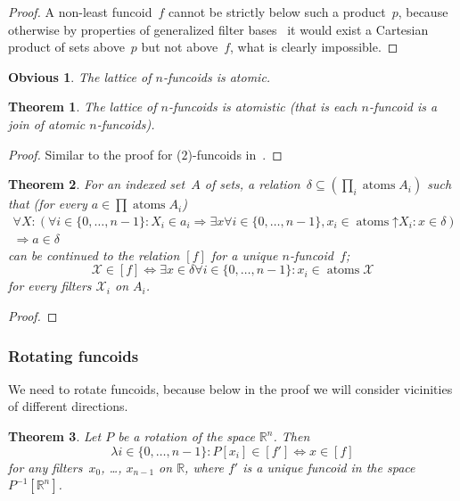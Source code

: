 \documentclass[oneside,draft]{amsart}
\newcommand{\atoms}{\operatorname{atoms}}
\newcommand{\suprel}[1]{\left[#1\right]}
\newtheorem{thm}{Theorem}
\newtheorem{obvious}{Obvious}
\begin{document}
\begin{proof}
A non-least funcoid~$f$ cannot be strictly below such a product~$p$, because otherwise by properties of generalized filter bases~\cite{volume-1} it would exist a Cartesian product of sets above~$p$ but not above~$f$, what is clearly impossible.
\end{proof}

\begin{obvious}
The lattice of $n$-fun\-co\-ids is atomic.
\end{obvious}

\begin{thm}
The lattice of $n$-fun\-co\-ids is atomistic (that is each $n$-fun\-co\-id is a join of atomic $n$-fun\-co\-ids).
\end{thm}

\begin{proof}
Similar to the proof for ($2$)-fun\-co\-ids in~\cite{volume-1}.
\end{proof}

\begin{thm}
For an indexed set~$A$ of sets, a relation~$\delta\subseteq(\prod_i\atoms A_i)$ such that (for every $a\in\prod\atoms A_i$)
\begin{multline*}
\forall X:(\forall i\in\{0,\dots,n-1\}:X_i\in a_i\Rightarrow\exists x\forall i\in\{0,\dots,n-1\}, x_i\in\atoms\mathord{\uparrow}X_i: x\in\delta)
\\\Rightarrow a\in\delta
\end{multline*}
can be continued to the relation $\suprel{f}$ for a unique $n$-fun\-co\-id~$f$;
\[ \mathcal{X}\in\suprel{f} \Leftrightarrow \exists x\in\delta\forall i\in\{0,\dots,n-1\}:x_i\in\atoms\mathcal{X} \]
for every filters $\mathcal{X}_i$ on $A_i$.
\end{thm}

\begin{proof}
\end{proof}

\subsubsection{Rotating funcoids}

We need to rotate funcoids, because below in the proof we will consider vicinities of different directions.

\begin{thm}
Let $P$ be a rotation of the space $\mathbb{R}^n$. Then
\[ \lambda i\in\{0,\dots,n-1\}:P[x_i]\in\suprel{f'} \Leftrightarrow x\in\suprel{f} \]
for any filters~$x_0$, \dots, $x_{n-1}$ on $\mathbb{R}$,
where $f'$ is a unique funcoid in the space $P^{-1}[\mathbb{R}^n]$.
\end{thm}
\end{document}
